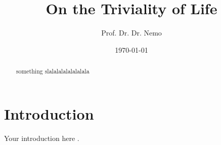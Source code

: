 \documentclass{article}
\title{On the Triviality of Life}
\author{Prof. Dr. Dr. Nemo}
\date{\today}
\begin{document}
\maketitle

\begin{abstract}
something slalalalalalalalala
\end{abstract}

\section{Introduction}
Your introduction here \cite{example}.



\end{document}
